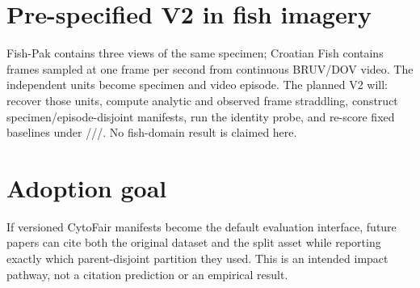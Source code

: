 \section{Pre-specified V2 in fish imagery}

Fish-Pak contains three views of the same specimen; Croatian Fish contains frames sampled at one frame per second from continuous BRUV/DOV video. The independent units become specimen and video episode. The planned V2 will: recover those units, compute analytic and observed frame straddling, construct specimen/episode-disjoint manifests, run the identity probe, and re-score fixed baselines under ///. No fish-domain result is claimed here.

\section{Adoption goal}

If versioned CytoFair manifests become the default evaluation interface, future papers can cite both the original dataset and the split asset while reporting exactly which parent-disjoint partition they used. This is an intended impact pathway, not a citation prediction or an empirical result.
